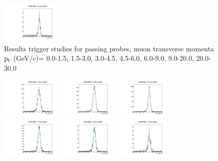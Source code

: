 \documentclass{article}
\begin{document}
\begin{figure}
    \includegraphics[width=0.25\textwidth]{../PlotsRooFitMC/croofit_trg_pass_6.pdf}
    \caption{Results trigger studies for passing probes, muon transverse momenta
    $\rm p_{t}$ (GeV/c)= {0.0-1.5}, {1.5-3.0}, {3.0-4.5}, {4.5-6.0}, 
    {6.0-9.0}, {9.0-20.0}, {20.0-30.0}}
\end{figure}

\begin{figure}
    \includegraphics[width=0.25\textwidth]{../PlotsRooFitMC/croofit_trg_fail_0.pdf}
    \includegraphics[width=0.25\textwidth]{../PlotsRooFitMC/croofit_trg_fail_1.pdf}
    \includegraphics[width=0.25\textwidth]{../PlotsRooFitMC/croofit_trg_fail_2.pdf}
    \includegraphics[width=0.25\textwidth]{../PlotsRooFitMC/croofit_trg_fail_3.pdf}
    \includegraphics[width=0.25\textwidth]{../PlotsRooFitMC/croofit_trg_fail_4.pdf}
    \includegraphics[width=0.25\textwidth]{../PlotsRooFitMC/croofit_trg_fail_5.pdf}

\end{figure}
\end{document}
